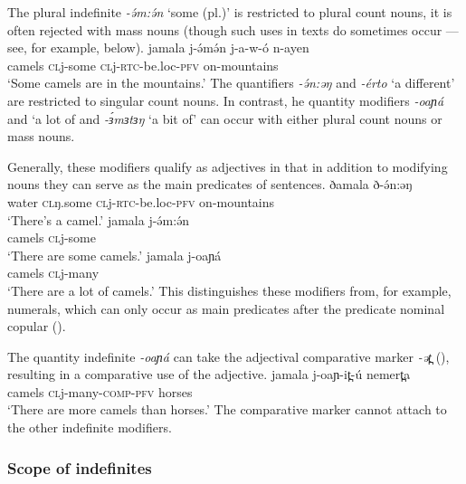 The plural indefinite \textit{-ə́m:ə́n} `some (pl.)' is restricted to plural count nouns, it is often rejected with mass nouns (though such uses in texts do sometimes occur --- see, for example,  below).
\ea 
	\ea \gll jamala j-ə́mə́n j-a-w-ó n-ayen\\
			camels \textsc{cl}j-some \textsc{cl}j-\textsc{rtc}-be.loc-\textsc{pfv} on-mountains\\
		\glt	`Some camels are in the mountains.'
	\z 
\z 
The quantifiers \textit{-ə́n:əŋ} and \textit{-érto} `a different' are restricted to singular count nouns. In contrast, he quantity modifiers \textit{-oaɲá} and `a lot of and  
\textit{-ɜ́mɜtɜŋ} `a bit of' can occur with either plural count nouns or mass nouns.

Generally, these modifiers qualify as adjectives in that in addition to modifying nouns they can serve as the main predicates of sentences. 
\ea
	\ea \gll  ðamala ð-ə́n:əŋ\\
			water \textsc{cl}ŋ.some \textsc{cl}j-\textsc{rtc}-be.loc-\textsc{pfv} on-mountains\\
		\glt	`There's a camel.'
	\ex  \gll jamala j-ə́m:ə́n\\
			camels \textsc{cl}j-some\\
		\glt 	`There are some camels.'
	\ex \gll jamala j-oaɲá\\
			camels \textsc{cl}j-many\\
		\glt 	`There are a lot of camels.'
\z
\z
This distinguishes these modifiers from, for example, numerals, which can only occur as main predicates after the predicate nominal copular (). 

The quantity indefinite \textit{-oaɲá} can take the adjectival comparative marker \textit{-ət̪} (), resulting in a comparative use of the adjective.
\ea \gll jamala j-oaɲ-it̪-ú nemert̪a\\
			camels \textsc{cl}j-many-\textsc{comp}-\textsc{pfv} horses\\
	\glt 	`There are more camels than horses.'
\z
The comparative marker cannot attach to the other indefinite modifiers.


\subsubsection{Scope of indefinites}

